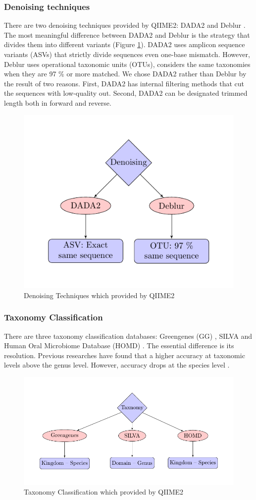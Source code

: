 \documentclass[a4paper]{article}
\begin{document}
            \subsubsection{Denoising techniques}
                There are two denoising techniques provided by QIIME2: DADA2 \cite{DADA1} and Deblur \cite{deblur1}. The most meaningful difference between DADA2 and Deblur is the strategy that divides them into different variants (Figure \ref{fig:denosing-workflow}). DADA2 uses amplicon sequence variants (ASVs) that strictly divide sequences even one-base mismatch. However, Deblur uses operational taxonomic units (OTUs), considers the same taxonomies when they are 97 \% or more matched. We chose DADA2 rather than Deblur by the result of two reasons. First, DADA2 has internal filtering methods that cut the sequences with low-quality out. Second, DADA2 can be designated trimmed length both in forward and reverse.

                \begin{figure}[p]
                    \centering
                    \includegraphics[width=0.5 \linewidth]{figures/denoising/denoising.pdf}
                    \caption{Denoising Techniques which provided by QIIME2}
                    \label{fig:denosing-workflow}
                \end{figure}

            \subsubsection{Taxonomy Classification}
                There are three taxonomy classification databases: Greengenes (GG) \cite{greengenes1}, SILVA \cite{silva1} and Human Oral Microbiome Database (HOMD) \cite{homd1}. The essential difference is its resolution. Previous researches have found that a higher accuracy at taxonomic levels above the genus level. However, accuracy drops at the species level \cite{performance1}.

                \begin{figure}[p]
                    \centering
                    \includegraphics[width=0.5 \linewidth]{figures/taxonomy/taxonomy.pdf}
                    \caption{Taxonomy Classification which provided by QIIME2}
                    \label{fig:taxonomy-workflow}
                \end{figure}
\end{document}
